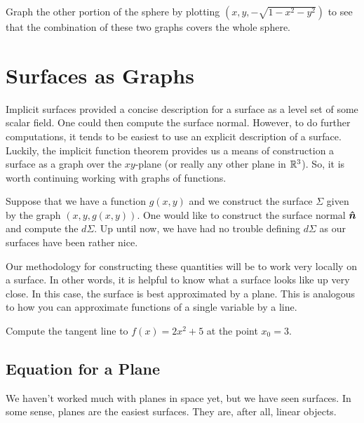                  \begin{exercise}
                 	Graph the other portion of the sphere by plotting $(x,y,-\sqrt{1-x^2-y^2})$ to see that the combination of these two graphs covers the whole sphere.
                 \end{exercise}

                 \section{Surfaces as Graphs}

                 Implicit surfaces provided a concise description for a surface as a level set of some scalar field.  One could then compute the surface normal.   However, to do further computations, it tends to be easiest to use an explicit description of a surface.  Luckily, the implicit function theorem provides us a means of construction a surface as a graph over the $xy$-plane (or really any other plane in $\mathbb{R}^3$).  So, it is worth continuing working with graphs of functions.

                 Suppose that we have a function $g(x,y)$ and we construct the surface $\Sigma$ given by the graph $(x,y,g(x,y))$.  One would like to construct the surface normal $\boldsymbol{\hat{n}}$ and compute the  $d\Sigma$. Up until now, we have had no trouble defining $d\Sigma$ as our surfaces have been rather nice.

                 Our methodology for constructing these quantities will be to work very locally on a surface.  In other words, it is helpful to know what a surface looks like up very close.  In this case, the surface is best approximated by a plane.  This is analogous to how you can approximate functions of a single variable by a line.

                                        \begin{exercise}
                                        Compute the tangent line to $f(x)=2x^2+5$ at the point $x_0=3$.
                                        \end{exercise}

                                        \subsection{Equation for a Plane}

                                        We haven't worked much with planes in space yet, but we have seen surfaces.  In some sense, planes are the easiest surfaces.  They are, after all, linear objects.

